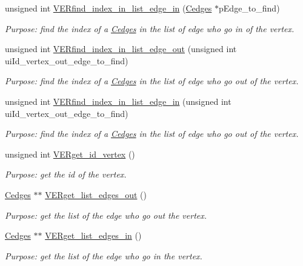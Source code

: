 \begin{DoxyCompactItemize}
unsigned int \hyperlink{class_cvertex_a59f3b2cac925e322344e3158a762b8c5}{V\+E\+Rfind\+\_\+index\+\_\+in\+\_\+list\+\_\+edge\+\_\+in} (\hyperlink{class_cedges}{Cedges} $\ast$p\+Edge\+\_\+to\+\_\+find)
\begin{DoxyCompactList}\small\item\em Purpose\+: find the index of a \hyperlink{class_cedges}{Cedges} in the list of edge who go in of the vertex. \end{DoxyCompactList}\item 
unsigned int \hyperlink{class_cvertex_a65e2d9b32e91dbaf38fe44881b6eb425}{V\+E\+Rfind\+\_\+index\+\_\+in\+\_\+list\+\_\+edge\+\_\+out} (unsigned int ui\+Id\+\_\+vertex\+\_\+out\+\_\+edge\+\_\+to\+\_\+find)
\begin{DoxyCompactList}\small\item\em Purpose\+: find the index of a \hyperlink{class_cedges}{Cedges} in the list of edge who go out of the vertex. \end{DoxyCompactList}\item 
unsigned int \hyperlink{class_cvertex_ac3c85ea85f5abd32877f5bcae8fd012e}{V\+E\+Rfind\+\_\+index\+\_\+in\+\_\+list\+\_\+edge\+\_\+in} (unsigned int ui\+Id\+\_\+vertex\+\_\+out\+\_\+edge\+\_\+to\+\_\+find)
\begin{DoxyCompactList}\small\item\em Purpose\+: find the index of a \hyperlink{class_cedges}{Cedges} in the list of edge who go out of the vertex. \end{DoxyCompactList}\item 
unsigned int \hyperlink{class_cvertex_a3a792e08f085841355b57639e66bda1e}{V\+E\+Rget\+\_\+id\+\_\+vertex} ()
\begin{DoxyCompactList}\small\item\em Purpose\+: get the id of the vertex. \end{DoxyCompactList}\item 
\hyperlink{class_cedges}{Cedges} $\ast$$\ast$ \hyperlink{class_cvertex_a7e7923c919c93f15414b6c49b252a780}{V\+E\+Rget\+\_\+list\+\_\+edges\+\_\+out} ()
\begin{DoxyCompactList}\small\item\em Purpose\+: get the list of the edge who go out the vertex. \end{DoxyCompactList}\item 
\hyperlink{class_cedges}{Cedges} $\ast$$\ast$ \hyperlink{class_cvertex_a0bc728846b99cfd6f2cb5b9970927bfc}{V\+E\+Rget\+\_\+list\+\_\+edges\+\_\+in} ()
\begin{DoxyCompactList}\small\item\em Purpose\+: get the list of the edge who go in the vertex. \end{DoxyCompactList}\item 

\end{DoxyCompactItemize}
